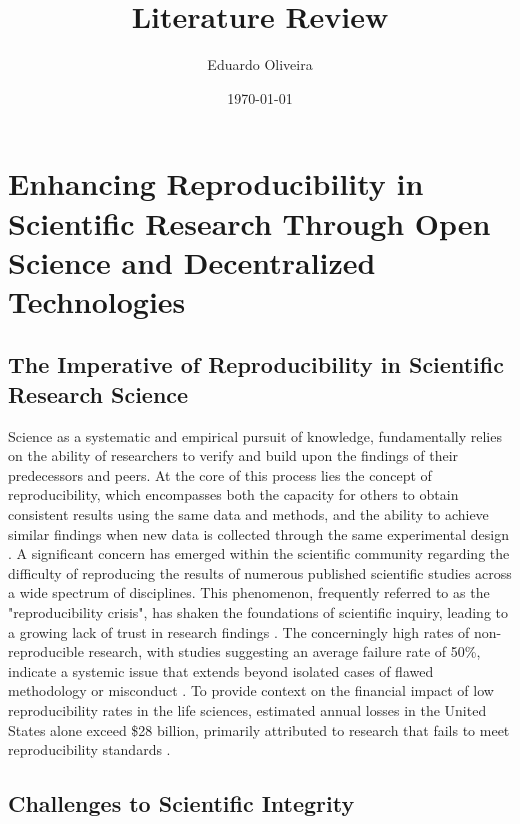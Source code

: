 \documentclass{article}
\title{Literature Review}
\author{Eduardo Oliveira}
\date{\today}
\begin{document}
\maketitle

\listoftodos


\section{Enhancing Reproducibility in Scientific Research Through Open Science and Decentralized Technologies}

\subsection{The Imperative of Reproducibility in Scientific Research Science}

Science as a systematic and empirical pursuit of knowledge, fundamentally relies on the ability of researchers to verify and build upon the findings of their predecessors and peers. At the core of this process lies the concept of reproducibility, which encompasses both the capacity for others to obtain consistent results using the same data and methods, and the ability to achieve similar findings when new data is collected through the same experimental design \cite{pellizzari_reproducibility_2017, committee_2019}. A significant concern has emerged within the scientific community regarding the difficulty of reproducing the results of numerous published scientific studies across a wide spectrum of disciplines. This phenomenon, frequently referred to as the "reproducibility crisis", has shaken the foundations of scientific inquiry, leading to a growing lack of trust in research findings \cite{baker2016reproducibility}. The concerningly high rates of non-reproducible research, with studies suggesting an average failure rate of 50\%, indicate a systemic issue that extends beyond isolated cases of flawed methodology or misconduct \cite{branch_reproducibility_2019}. To provide context on the financial impact of low reproducibility rates in the life sciences, estimated annual losses in the United States alone exceed \$28 billion, primarily attributed to research that fails to meet reproducibility standards \cite{freedman2015economics}.


\subsection{Challenges to Scientific Integrity}
\end{document}

